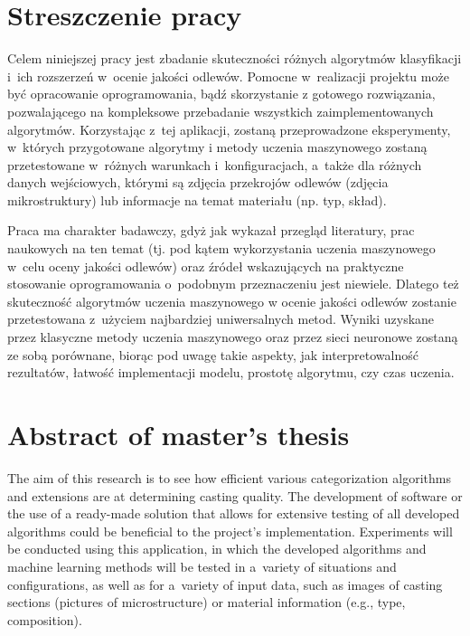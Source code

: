 \section*{Streszczenie pracy}

Celem niniejszej pracy jest zbadanie skuteczności różnych algorytmów klasyfikacji i~ich rozszerzeń w~ocenie jakości odlewów. Pomocne w~realizacji projektu może być opracowanie oprogramowania, bądź skorzystanie z gotowego rozwiązania, pozwalającego na kompleksowe przebadanie wszystkich zaimplementowanych algorytmów. Korzystając z~tej aplikacji, zostaną przeprowadzone eksperymenty, w~których przygotowane algorytmy i metody uczenia maszynowego zostaną przetestowane w~różnych warunkach i~konfiguracjach, a~także dla różnych danych wejściowych, którymi są zdjęcia przekrojów odlewów (zdjęcia mikrostruktury) lub informacje na temat materiału (np. typ, skład). 

Praca ma charakter badawczy, gdyż jak wykazał przegląd literatury, prac naukowych na ten temat (tj. pod kątem wykorzystania uczenia maszynowego w~celu oceny jakości odlewów) oraz źródeł wskazujących na praktyczne stosowanie oprogramowania o~podobnym przeznaczeniu jest niewiele. Dlatego też skuteczność algorytmów uczenia maszynowego w ocenie jakości odlewów zostanie przetestowana z~użyciem najbardziej uniwersalnych metod. Wyniki uzyskane przez klasyczne metody uczenia maszynowego oraz przez sieci neuronowe zostaną ze sobą porównane, biorąc pod uwagę takie aspekty, jak interpretowalność rezultatów, łatwość implementacji modelu, prostotę algorytmu, czy czas uczenia.


\section*{Abstract of master's thesis}

The aim of this research is to see how efficient various categorization algorithms and extensions are at determining casting quality. The development of software or the use of a ready-made solution that allows for extensive testing of all developed algorithms could be beneficial to the project's implementation. Experiments will be conducted using this application, in which the developed algorithms and machine learning methods will be tested in a~variety of situations and configurations, as well as for a~variety of input data, such as images of casting sections (pictures of microstructure) or material information (e.g., type, composition).

